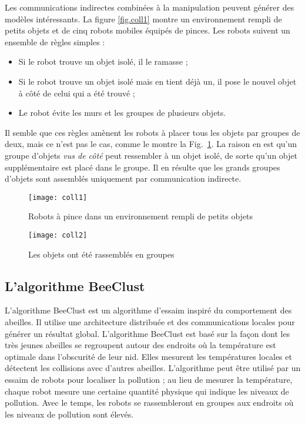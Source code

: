Les communications indirectes combinées à la manipulation peuvent générer des modèles intéressants. La figure \ref{fig.coll1} montre un environnement rempli de petits objets et de cinq robots mobiles équipés de pinces. Les robots suivent un ensemble de règles simples :
\begin{itemize}
\item Si le robot trouve un objet isolé, il le ramasse ;
\item Si le robot trouve un objet isolé mais en tient déjà un, il pose le nouvel objet à côté de celui qui a été trouvé ;
\item Le robot évite les murs et les groupes de plusieurs objets.
\end{itemize}
Il semble que ces règles amènent les robots à placer tous les objets par groupes de deux, mais ce n'est pas le cas, comme le montre la Fig.~\ref{fig.coll2}. La raison en est qu'un groupe d'objets \emph{vus de côté} peut ressembler à un objet isolé, de sorte qu'un objet supplémentaire est placé dans le groupe. Il en résulte que les grands groupes d'objets sont assemblés uniquement par communication indirecte.

\begin{figure}
\begin{minipage}{.45\textwidth}
\texttt{[image: coll1]}
\caption{Robots à pince dans un environnement rempli de petits objets}
\label{fig.coll1}
\end{minipage}
\hspace{\fill}
\begin{minipage}{.45\textwidth}
\texttt{[image: coll2]}
\caption{Les objets ont été rassemblés en groupes}
\label{fig.coll2}
\end{minipage}
\end{figure}

\subsection{L'algorithme BeeClust}

L'algorithme BeeClust est un algorithme d'essaim inspiré du comportement des abeilles. Il utilise une architecture distribuée et des communications locales pour générer un résultat global. L'algorithme BeeClust est basé sur la façon dont les très jeunes abeilles se regroupent autour des endroits où la température est optimale dans l'obscurité de leur nid. Elles mesurent les températures locales et détectent les collisions avec d'autres abeilles.  L'algorithme peut être utilisé par un essaim de robots pour localiser la pollution ; au lieu de mesurer la température, chaque robot mesure une certaine quantité physique qui indique les niveaux de pollution. Avec le temps, les robots se rassembleront en groupes aux endroits où les niveaux de pollution sont élevés.

